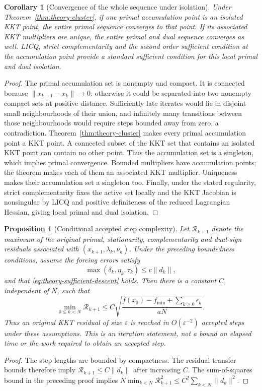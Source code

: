 \documentclass[pdflatex,sn-mathphys-num]{sn-jnl}
\theoremstyle{thmstyleone}
\newtheorem{proposition}[theorem]{Proposition}
\newtheorem{corollary}[theorem]{Corollary}
\theoremstyle{thmstylethree}
\begin{document}
\begin{corollary}[Convergence of the whole sequence under isolation]
\label{cor:theory-full-sequence}
Under Theorem~\ref{thm:theory-cluster}, if one primal accumulation point is
an isolated KKT point, the entire primal sequence converges to that point.
If its associated KKT multipliers are unique, the entire primal and dual
sequence converges as well. LICQ, strict complementarity and the
second order sufficient condition at the accumulation point provide a
standard sufficient condition for this local primal and dual isolation.
\end{corollary}
\begin{proof}
The primal accumulation set is nonempty and compact. It is connected
because $\|x_{k+1}-x_k\|\to0$: otherwise it could be separated into two
nonempty compact sets at positive distance. Sufficiently late iterates
would lie in disjoint small neighbourhoods of their union, and infinitely
many transitions between those neighbourhoods would require steps bounded
away from zero, a contradiction. Theorem~\ref{thm:theory-cluster} makes
every primal accumulation point a KKT point. A connected subset of the
KKT set that contains an isolated KKT point can contain no other point.
Thus the accumulation set is a singleton, which implies primal
convergence. Bounded multipliers have accumulation points; the theorem
makes each of them an associated KKT multiplier. Uniqueness makes their
accumulation set a singleton too. Finally, under the stated regularity,
strict complementarity fixes the active set locally and the KKT Jacobian
is nonsingular by LICQ and positive definiteness of the reduced
Lagrangian Hessian, giving local primal and dual isolation.
\end{proof}

\begin{proposition}[Conditional accepted step complexity]
\label{prop:theory-complexity}
Let $\mathcal R_{k+1}$ denote the maximum of the original primal,
stationarity, complementarity and dual-sign residuals associated with
$(x_{k+1},\lambda_k,\nu_k)$. Under the preceding boundedness conditions,
assume the forcing errors satisfy
\[
 \max(\delta_k,\eta_k,\tau_k)\leq c\|d_k\|,
\]
and that \eqref{eq:theory-sufficient-descent} holds. Then there is a
constant $C$, independent of $N$, such that
\[
 \min_{0\leq k<N}\mathcal R_{k+1}
 \leq C\sqrt{\frac{f(x_0)-f_{\min}+\sum_{k\geq0}\epsilon_k}{aN}}.
\]
Thus an original KKT residual of size $\varepsilon$ is reached in
$O(\varepsilon^{-2})$ accepted steps under these assumptions.
This is an iteration statement, not a bound on elapsed time or the work
required to obtain an accepted step.
\end{proposition}
\begin{proof}
The step lengths are bounded by compactness. The residual transfer bounds
therefore imply $\mathcal R_{k+1}\leq C\|d_k\|$ after increasing $C$.
The sum-of-squares bound in the preceding proof implies
$N\min_{k<N}\mathcal R_{k+1}^2\leq C^2\sum_{k<N}\|d_k\|^2$.
\end{proof}
\end{document}
